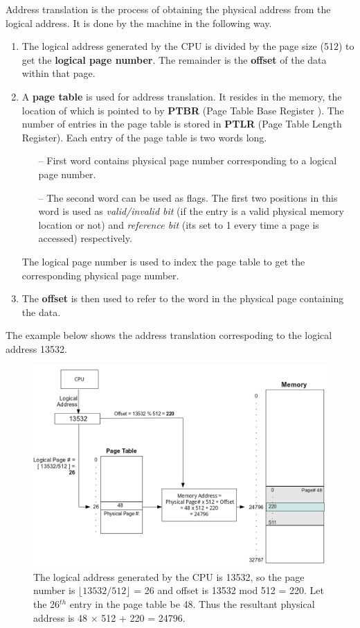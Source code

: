 \documentclass[11pt]{report}
\begin{document}
Address translation is the process of obtaining the physical address from the logical address. It is done by the machine in the following way. 
\begin{enumerate}
\item The logical address generated by the CPU is divided by the page size (512) to get the \textbf{logical page number}. The remainder is the \textbf{offset} of the data within that page.


\item A \textbf{page table} is used for address translation. It resides in the memory, the location of which is pointed to by \textbf{PTBR} (Page Table Base Register
). The number of entries in the page table is stored in \textbf{PTLR} (Page Table Length Register). Each entry of the page table is two words long.
\begin{itemize}
 \item[--] First word contains physical page number corresponding to a logical page number.
 \item[--] The second word can be used as flags. The first two positions in this word is used as \textit{valid/invalid bit} (if the entry is a valid physical memory location or not) and \textit{reference bit} (its set to 1 every time a page is accessed) respectively.
 	
\end{itemize}
The logical page number is used to index the page table to get the corresponding physical page number.

\item The \textbf{offset} is then used to refer to the word in the physical page containing the data.
\end{enumerate} 
\vspace{0.3in}

The example below shows the address translation correspoding to the logical address  13532.
\begin{figure}[ht]
	\centering
	\includegraphics[scale=0.35]{address_translation.png}
	\caption{ \small The logical address generated by the CPU is 13532, so the page number is $\lfloor 13532/512 \rfloor$ = 26 and offset is 13532 mod 512 = 220. Let the 26$^{th}$ entry in the page table be 48. Thus the resultant physical address is 48 $\times$ 512 + 220 = 24796.}
	\label{fig:paging}
\end{figure}
\end{document}
